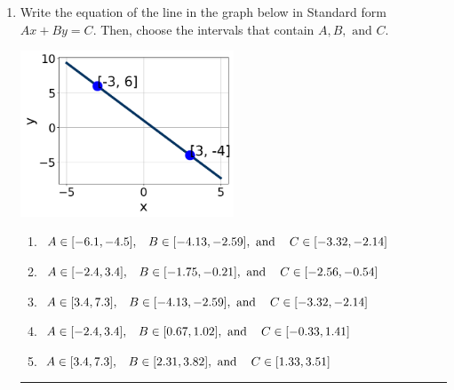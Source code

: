 \documentclass[14pt]{extbook}
\newcommand{\litem}[1]{\item#1\hspace*{-1cm}\rule{\textwidth}{0.4pt}}
\begin{document}
\begin{enumerate}
{\begin{enumerate}[label=\Alph*.]
\end{enumerate} }
\litem{
Write the equation of the line in the graph below in Standard form $Ax+By=C$. Then, choose the intervals that contain $A, B, \text{ and } C$.
\begin{center}
    \includegraphics[width=0.5\textwidth]{../Figures/linearGraphToStandardC.png}
\end{center}
\begin{enumerate}[label=\Alph*.]
\item \( A \in [-6.1, -4.5], \hspace{3mm} B \in [-4.13, -2.59], \text{ and } \hspace{3mm} C \in [-3.32, -2.14] \)
\item \( A \in [-2.4, 3.4], \hspace{3mm} B \in [-1.75, -0.21], \text{ and } \hspace{3mm} C \in [-2.56, -0.54] \)
\item \( A \in [3.4, 7.3], \hspace{3mm} B \in [-4.13, -2.59], \text{ and } \hspace{3mm} C \in [-3.32, -2.14] \)
\item \( A \in [-2.4, 3.4], \hspace{3mm} B \in [0.67, 1.02], \text{ and } \hspace{3mm} C \in [-0.33, 1.41] \)
\item \( A \in [3.4, 7.3], \hspace{3mm} B \in [2.31, 3.82], \text{ and } \hspace{3mm} C \in [1.33, 3.51] \)

\end{enumerate} }
\end{enumerate}
\end{document}
